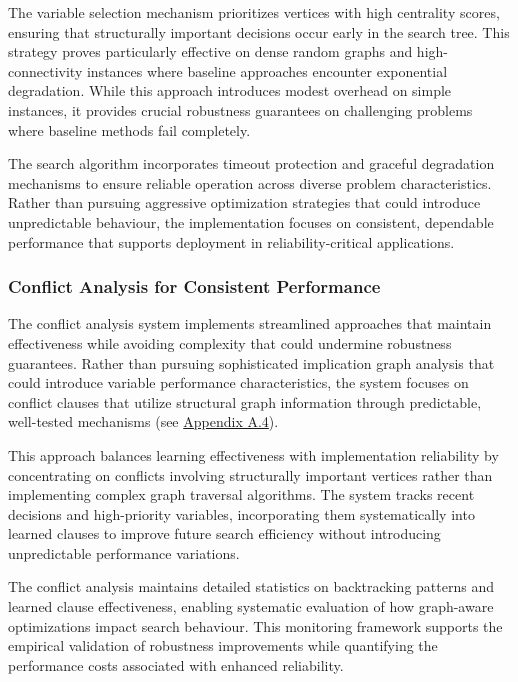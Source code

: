 The variable selection mechanism prioritizes vertices with high centrality scores, ensuring that structurally important decisions occur early in the search tree. This strategy proves particularly effective on dense random graphs and high-connectivity instances where baseline approaches encounter exponential degradation. While this approach introduces modest overhead on simple instances, it provides crucial robustness guarantees on challenging problems where baseline methods fail completely.

The search algorithm incorporates timeout protection and graceful degradation mechanisms to ensure reliable operation across diverse problem characteristics. Rather than pursuing aggressive optimization strategies that could introduce unpredictable behaviour, the implementation focuses on consistent, dependable performance that supports deployment in reliability-critical applications.

\subsubsection{Conflict Analysis for Consistent Performance}

The conflict analysis system implements streamlined approaches that maintain effectiveness while avoiding complexity that could undermine robustness guarantees. Rather than pursuing sophisticated implication graph analysis that could introduce variable performance characteristics, the system focuses on conflict clauses that utilize structural graph information through predictable, well-tested mechanisms (see \hyperref[appendix:conflict-analysis]{Appendix A.4}).

This approach balances learning effectiveness with implementation reliability by concentrating on conflicts involving structurally important vertices rather than implementing complex graph traversal algorithms. The system tracks recent decisions and high-priority variables, incorporating them systematically into learned clauses to improve future search efficiency without introducing unpredictable performance variations.

The conflict analysis maintains detailed statistics on backtracking patterns and learned clause effectiveness, enabling systematic evaluation of how graph-aware optimizations impact search behaviour. This monitoring framework supports the empirical validation of robustness improvements while quantifying the performance costs associated with enhanced reliability.

